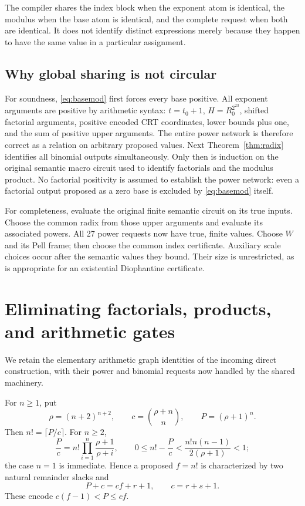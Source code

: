 \documentclass[11pt,letterpaper]{article}
\theoremstyle{definition}\newtheorem{definition}[theorem]{Definition}
\theoremstyle{remark}\newtheorem{remark}[theorem]{Remark}
\begin{document}
The compiler shares the index block when the exponent atom is identical,
the modulus when the base atom is identical, and the complete request when
both are identical. It does not identify distinct expressions merely
because they happen to have the same value in a particular assignment.

\subsection{Why global sharing is not circular}

For soundness, \eqref{eq:basemod} first forces every base positive.
All exponent arguments are positive by arithmetic syntax: $t=t_0+1$,
$H=R_0^{2^{23}}$, shifted factorial arguments, positive encoded CRT
coordinates, lower bounds plus one, and the sum of positive upper
arguments. The entire power network is therefore correct as a relation
on arbitrary proposed values. Next Theorem~\ref{thm:radix} identifies
all binomial outputs simultaneously. Only then is induction on the
original semantic macro circuit used to identify factorials and the
modulus product. No factorial positivity is assumed to establish the
power network: even a factorial output proposed as a zero base is
excluded by \eqref{eq:basemod} itself.

For completeness, evaluate the original finite semantic circuit on its
true inputs. Choose the common radix from those upper arguments and
evaluate its associated powers. All 27 power requests now have true,
finite values. Choose $W$ and its Pell frame; then choose the common
index certificate. Auxiliary scale choices occur after the semantic
values they bound. Their size is unrestricted, as is appropriate for an
existential Diophantine certificate.

\section{Eliminating factorials, products, and arithmetic gates}
\label{sec:materialization}

We retain the elementary arithmetic graph identities of the incoming
direct construction, with their power and binomial requests now handled
by the shared machinery.

For $n\ge1$, put
\[
 \rho=(n+2)^{n+2},\qquad c=\binom{\rho+n}{n},\qquad P=(\rho+1)^n.
\]
Then $n!=\lceil P/c\rceil$. For $n\ge2$,
\[
 \frac Pc=n!\prod_{i=1}^n\frac{\rho+1}{\rho+i},\qquad
 0\le n!-\frac Pc<\frac{n!n(n-1)}{2(\rho+1)}<1;
\]
the case $n=1$ is immediate. Hence a proposed $f=n!$ is characterized
by two natural remainder slacks and
\[
 P+c=cf+r+1,\qquad c=r+s+1.
\]
These encode $c(f-1)<P\le cf$.
\end{document}
